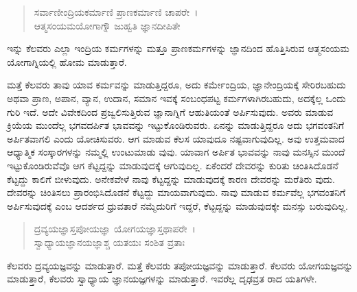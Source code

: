 \begin{verse}
ಸರ್ವಾಣೀಂದ್ರಿಯಕರ್ಮಾಣಿ ಪ್ರಾಣಕರ್ಮಾಣಿ ಚಾಪರೇ~।\\ಆತ್ಮಸಂಯಮಯೋಗಾಗ್ನೌ ಜುಹ್ವತಿ ಜ್ಞಾನದೀಪಿತೇ 
\end{verse}

{\small ಇನ್ನು ಕೆಲವರು ಎಲ್ಲಾ ಇಂದ್ರಿಯ ಕರ್ಮಗಳನ್ನು ಮತ್ತೂ ಪ್ರಾಣಕರ್ಮಗಳನ್ನು ಜ್ಞಾನದಿಂದ ಹೊತ್ತಿಸಿರುವ ಆತ್ಮಸಂಯಮ ಯೋಗಾಗ್ನಿಯಲ್ಲಿ ಹೋಮ ಮಾಡುತ್ತಾರೆ.}

ಮತ್ತೆ ಕೆಲವರು ತಾವು ಯಾವ ಕರ್ಮವನ್ನು ಮಾಡುತ್ತಿದ್ದರೂ, ಅದು ಕರ್ಮೇಂದ್ರಿಯ, ಜ್ಞಾನೇಂದ್ರಿಯಕ್ಕೆ ಸೇರಿರಬಹುದು ಅಥವಾ ಪ್ರಾಣ, ಅಪಾನ, ವ್ಯಾನ, ಉದಾನ, ಸಮಾನ ಇವಕ್ಕೆ ಸಂಬಂಧಪಟ್ಟ ಕರ್ಮಗಳಾಗಿರಬಹುದು, ಅದಕ್ಕೆಲ್ಲ ಒಂದು ಗುರಿ ಇದೆ. ಅದೇ ವಿವೇಕದಿಂದ ಪ್ರಜ್ವಲಿಸುತ್ತಿರುವ ಜ್ಞಾನಾಗ್ನಿಗೆ ಆಹುತಿಯಂತೆ ಅರ್ಪಿಸುವುದು. ಅವರು ಮಾಡುವ ಕ್ರಿಯೆಯ ಮುಂದೆಲ್ಲ ಭಗವದರ್ಪಿತ ಭಾವವನ್ನು ಇಟ್ಟುಕೊಂಡಿರುವರು. ಏನನ್ನು ಮಾಡುತ್ತಿದ್ದರೂ ಅದು ಭಗವಂತನಿಗೆ ಅರ್ಪಿತವಾಗಲಿ ಎಂದು ಯೋಚಿಸುವರು. ಆಗ ಮಾಡುವ ಕೆಲಸ ಯಾವುದೂ ನಷ್ಟವಾಗುವುದಿಲ್ಲ. ಅವು ಉತ್ತಮವಾದ ಆಧ್ಯಾತ್ಮಿಕ ಸಂಸ್ಕಾರಗಳನ್ನು ನಮ್ಮಲ್ಲಿ ಉಂಟುಮಾಡು ವುವು. ಯಾವಾಗ ಅರ್ಪಿತ ಭಾವವನ್ನು ನಾವು ಮನಸ್ಸಿನ ಮುಂದೆ ಇಟ್ಟುಕೊಂಡಿರುವೆವೊ ಆಗ ಕೆಟ್ಟದ್ದನ್ನು ಮಾಡುವುದಕ್ಕೆ ಆಗುವುದಿಲ್ಲ. ಏಕೆಂದರೆ ದೇವರನ್ನು ಕುರಿತು ಚಿಂತಿಸಿದೊಡನೆ ಕೆಟ್ಟದ್ದು ಕಾಲಿಗೆ ಬೀಳುವುದು. ಅನೇಕವೇಳೆ ನಾವು ಕೆಟ್ಟದ್ದನ್ನು ಮಾಡುವುದಕ್ಕೆ ಕಾರಣ ದೇವರನ್ನು ಮರೆತಿರು ವುದು. ದೇವರನ್ನು ಚಿಂತಿಸಲು ಪ್ರಾರಂಭಿಸಿದೊಡನೆ ಕೆಟ್ಟದ್ದು ಮಾಯವಾಗುವುದು. ನಾವು ಮಾಡುವ ಕರ್ಮವೆಲ್ಲ ಭಗವಂತನಿಗೆ ಅರ್ಪಿಸುವುದಕ್ಕೆ ಎಂಬ ಆದರ್ಶದ ಧ್ರುವತಾರೆ ನಮ್ಮೆದುರಿಗೆ ಇದ್ದರೆ, ಕೆಟ್ಟದ್ದನ್ನು ಮಾಡುವುದಕ್ಕೇ ಮನಸ್ಸು ಬರುವುದಿಲ್ಲ.

\begin{verse}
ದ್ರವ್ಯಯಜ್ಞಾಸ್ತಪೋಯಜ್ಞಾ ಯೋಗಯಜ್ಞಾಸ್ತಥಾಪರೇ~।\\ಸ್ವಾಧ್ಯಾಯಜ್ಞಾನಯಜ್ಞಾಶ್ಚ ಯತಯಃ ಸಂಶಿತ ವ್ರತಾಃ 
\end{verse}

{\small ಕೆಲವರು ದ್ರವ್ಯಯಜ್ಞವನ್ನು ಮಾಡುತ್ತಾರೆ. ಮತ್ತೆ ಕೆಲವರು ತಪೋಯಜ್ಞವನ್ನು ಮಾಡುತ್ತಾರೆ. ಕೆಲವರು ಯೋಗಯಜ್ಞವನ್ನು ಮಾಡುತ್ತಾರೆ, ಕೆಲವರು ಸ್ವಾಧ್ಯಾಯ ಜ್ಞಾನಯಜ್ಞಗಳನ್ನು ಮಾಡುತ್ತಾರೆ. ಇವರೆಲ್ಲ ದೃಢವ್ರತ ರಾದ ಯತಿಗಳೇ.}

